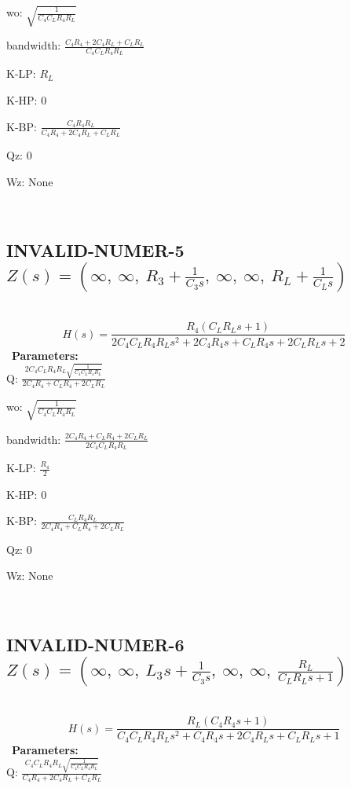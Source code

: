 \documentclass{article}
\begin{document}
wo: $\sqrt{\frac{1}{C_{4} C_{L} R_{4} R_{L}}}$\ 

bandwidth: $\frac{C_{4} R_{4} + 2 C_{4} R_{L} + C_{L} R_{L}}{C_{4} C_{L} R_{4} R_{L}}$\ 

K-LP: $R_{L}$\ 

K-HP: $0$\ 

K-BP: $\frac{C_{4} R_{4} R_{L}}{C_{4} R_{4} + 2 C_{4} R_{L} + C_{L} R_{L}}$\ 

Qz: $0$\ 

Wz: $\text{None}$\ 

\ 

\subsection{INVALID-NUMER-5 $Z(s) = \left( \infty, \  \infty, \  R_{3} + \frac{1}{C_{3} s}, \  \infty, \  \infty, \  R_{L} + \frac{1}{C_{L} s}\right)$ } \ 
\textbf{\[H(s) = \frac{R_{4} \left(C_{L} R_{L} s + 1\right)}{2 C_{4} C_{L} R_{4} R_{L} s^{2} + 2 C_{4} R_{4} s + C_{L} R_{4} s + 2 C_{L} R_{L} s + 2}\] } \ 
\textbf{Parameters:}\\ 

Q: $\frac{2 C_{4} C_{L} R_{4} R_{L} \sqrt{\frac{1}{C_{4} C_{L} R_{4} R_{L}}}}{2 C_{4} R_{4} + C_{L} R_{4} + 2 C_{L} R_{L}}$\ 

wo: $\sqrt{\frac{1}{C_{4} C_{L} R_{4} R_{L}}}$\ 

bandwidth: $\frac{2 C_{4} R_{4} + C_{L} R_{4} + 2 C_{L} R_{L}}{2 C_{4} C_{L} R_{4} R_{L}}$\ 

K-LP: $\frac{R_{4}}{2}$\ 

K-HP: $0$\ 

K-BP: $\frac{C_{L} R_{4} R_{L}}{2 C_{4} R_{4} + C_{L} R_{4} + 2 C_{L} R_{L}}$\ 

Qz: $0$\ 

Wz: $\text{None}$\ 

\ 

\subsection{INVALID-NUMER-6 $Z(s) = \left( \infty, \  \infty, \  L_{3} s + \frac{1}{C_{3} s}, \  \infty, \  \infty, \  \frac{R_{L}}{C_{L} R_{L} s + 1}\right)$ } \ 
\textbf{\[H(s) = \frac{R_{L} \left(C_{4} R_{4} s + 1\right)}{C_{4} C_{L} R_{4} R_{L} s^{2} + C_{4} R_{4} s + 2 C_{4} R_{L} s + C_{L} R_{L} s + 1}\] } \ 
\textbf{Parameters:}\\ 

Q: $\frac{C_{4} C_{L} R_{4} R_{L} \sqrt{\frac{1}{C_{4} C_{L} R_{4} R_{L}}}}{C_{4} R_{4} + 2 C_{4} R_{L} + C_{L} R_{L}}$\ 
\end{document}
